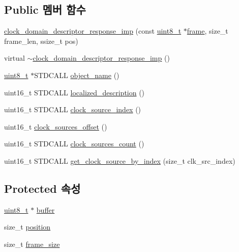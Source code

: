 \subsection*{Public 멤버 함수}
\begin{DoxyCompactItemize}
\item 
\hyperlink{classavdecc__lib_1_1clock__domain__descriptor__response__imp_a6c069936a7c1763953a0c39448d446ef}{clock\+\_\+domain\+\_\+descriptor\+\_\+response\+\_\+imp} (const \hyperlink{stdint_8h_aba7bc1797add20fe3efdf37ced1182c5}{uint8\+\_\+t} $\ast$\hyperlink{gst__avb__playbin_8c_ac8e710e0b5e994c0545d75d69868c6f0}{frame}, size\+\_\+t frame\+\_\+len, ssize\+\_\+t pos)
\item 
virtual \hyperlink{classavdecc__lib_1_1clock__domain__descriptor__response__imp_a819075725673241d2a1ff8d7804b7abd}{$\sim$clock\+\_\+domain\+\_\+descriptor\+\_\+response\+\_\+imp} ()
\item 
\hyperlink{stdint_8h_aba7bc1797add20fe3efdf37ced1182c5}{uint8\+\_\+t} $\ast$S\+T\+D\+C\+A\+LL \hyperlink{classavdecc__lib_1_1clock__domain__descriptor__response__imp_a15837e3eb254ad44812cb766ae8cd53c}{object\+\_\+name} ()
\item 
uint16\+\_\+t S\+T\+D\+C\+A\+LL \hyperlink{classavdecc__lib_1_1clock__domain__descriptor__response__imp_aa94307532fbb37e2f986fee8fec79373}{localized\+\_\+description} ()
\item 
uint16\+\_\+t S\+T\+D\+C\+A\+LL \hyperlink{classavdecc__lib_1_1clock__domain__descriptor__response__imp_a70e1656f102287e5f1b089568cff2fb5}{clock\+\_\+source\+\_\+index} ()
\item 
uint16\+\_\+t \hyperlink{classavdecc__lib_1_1clock__domain__descriptor__response__imp_aef4d86104abdf769704e5e53017064b9}{clock\+\_\+sources\+\_\+offset} ()
\item 
uint16\+\_\+t S\+T\+D\+C\+A\+LL \hyperlink{classavdecc__lib_1_1clock__domain__descriptor__response__imp_a334d3137f65e96a7618a66053d07b934}{clock\+\_\+sources\+\_\+count} ()
\item 
uint16\+\_\+t S\+T\+D\+C\+A\+LL \hyperlink{classavdecc__lib_1_1clock__domain__descriptor__response__imp_a5d6afe758fb137ac8918686cac8d0739}{get\+\_\+clock\+\_\+source\+\_\+by\+\_\+index} (size\+\_\+t clk\+\_\+src\+\_\+index)
\end{DoxyCompactItemize}
\subsection*{Protected 속성}
\begin{DoxyCompactItemize}
\item 
\hyperlink{stdint_8h_aba7bc1797add20fe3efdf37ced1182c5}{uint8\+\_\+t} $\ast$ \hyperlink{classavdecc__lib_1_1descriptor__response__base__imp_a56ed84df35de10bdb65e72b184309497}{buffer}
\item 
size\+\_\+t \hyperlink{classavdecc__lib_1_1descriptor__response__base__imp_a7a04afe5347934be732ec70a70bd0a28}{position}
\item 
size\+\_\+t \hyperlink{classavdecc__lib_1_1descriptor__response__base__imp_affd041a595cabab98275245b9cb2824d}{frame\+\_\+size}
\end{DoxyCompactItemize}
